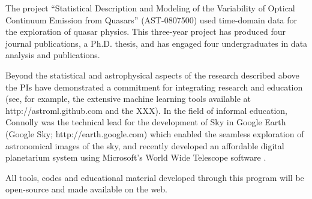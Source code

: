 The project ``Statistical Description and Modeling of the Variability
of Optical Continuum Emission from Quasars'' (AST-0807500) used
time-domain data for the exploration of quasar physics. This
three-year project has produced four journal publications, a
Ph.D. thesis, and has engaged four undergraduates in data analysis and
publications.



Beyond the statistical and astrophysical aspects of the research
described above the PIs have demonstrated a commitment for integrating
research and education (see, for example, the extensive machine
learning tools available at http://astroml.github.com and the XXX). In
the field of informal education, Connolly was the technical lead for
the development of Sky in Google Earth (Google Sky;
http://earth.google.com) which enabled the seamless exploration of
astronomical images of the sky, and recently developed an affordable
digital planetarium system using Microsoft's World Wide Telescope
software \cite{rosenfield2011}.

All tools, codes and educational material developed through this
program will be open-source and made available on the web. 




